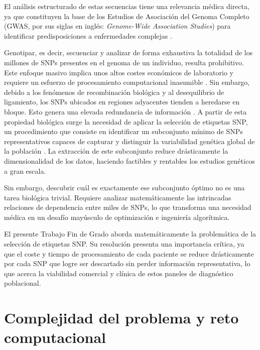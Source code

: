 El análisis estructurado de estas secuencias tiene una relevancia médica directa, ya que constituyen la base de los Estudios de Asociación del Genoma Completo (GWAS, por sus siglas en inglés: \textit{Genome-Wide Association Studies}) para identificar predisposiciones a enfermedades complejas \cite{hinds2005whole}.

Genotipar, es decir, secuenciar y analizar de forma exhaustiva la totalidad de los millones de SNPs presentes en el genoma de un individuo, resulta prohibitivo. Este enfoque masivo implica unos altos costes económicos de laboratorio y requiere un esfuerzo de procesamiento computacional inasumible \cite{ting2010multi}. Sin embargo, debido a los fenómenos de recombinación biológica y al desequilibrio de ligamiento, los SNPs ubicados en regiones adyacentes tienden a heredarse en bloque. Esto genera una elevada redundancia de información \cite{bafna2003haplotypes}. A partir de esta propiedad biológica surge la necesidad de aplicar la selección de etiquetas SNP, un procedimiento que consiste en identificar un subconjunto mínimo de SNPs representativos capaces de capturar y distinguir la variabilidad genética global de la población \cite{ting2010multi, moqa2022assessing}. La extracción de este subconjunto reduce drásticamente la dimensionalidad de los datos, haciendo factibles y rentables los estudios genéticos a gran escala.

Sin embargo, descubrir cuál es exactamente ese subconjunto óptimo no es una tarea biológica trivial. Requiere analizar matemáticamente las intrincadas relaciones de dependencia entre miles de SNPs, lo que transforma una necesidad médica en un desafío mayúsculo de optimización e ingeniería algorítmica.

El presente Trabajo Fin de Grado aborda matemáticamente la problemática de la selección de etiquetas SNP. Su resolución presenta una importancia crítica, ya que el coste y tiempo de procesamiento de cada paciente se reduce drásticamente por cada SNP que logre ser descartado sin perder información representativa, lo que acerca la viabilidad comercial y clínica de estos paneles de diagnóstico poblacional.

\section{Complejidad del problema y reto computacional}

